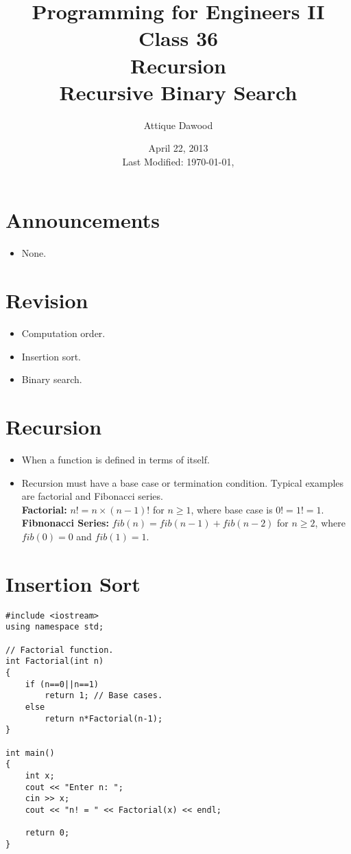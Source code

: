 \documentclass[12pt,a4paper]{article}
\title{\vspace{-2cm}Programming for Engineers II\\Class 36\\Recursion\\Recursive Binary Search}
\author{Attique Dawood}
\date{April 22, 2013\\[0.2cm] Last Modified: \today, \currenttime}
\begin{document}
\maketitle
\section{Announcements}
\begin{itemize}
\item None.
\end{itemize}
\section{Revision}
\begin{itemize}
\item Computation order.
\item Insertion sort.
\item Binary search.
\end{itemize}
\section{Recursion}
\begin{itemize}
\item When a function is defined in terms of itself.
\item Recursion must have a base case or termination condition. Typical examples are factorial and Fibonacci series.\\
\noindent\textbf{Factorial:} $n! = n\times(n-1)!$ for $n\geq 1$, where base case is $0! = 1! = 1.$\\
\noindent\textbf{Fibnonacci Series:} $fib(n) = fib(n-1) + fib(n-2)$ for $n\geq 2$, where $fib(0) = 0$ and $fib(1) = 1.$
\end{itemize}
\section{Insertion Sort}
\begin{lstlisting}[caption={Recursive Factorial},escapechar=$]
#include <iostream>
using namespace std;

// Factorial function.
int Factorial(int n)
{
	if (n==0||n==1)
		return 1; // Base cases.
	else
		return n*Factorial(n-1);
}

int main()
{
	int x;
	cout << "Enter n: ";
	cin >> x;
	cout << "n! = " << Factorial(x) << endl;

	return 0;
}
\end{lstlisting}
\end{document}
